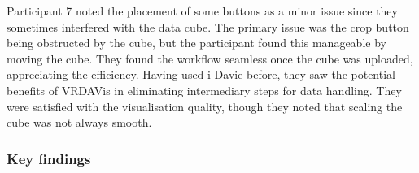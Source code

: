 



Participant 7 noted the placement of some buttons as a minor issue since they sometimes interfered with the data cube.
The primary issue was the crop button being obstructed by the cube, but the participant found this manageable by moving the cube. 
They found the workflow seamless once the cube was uploaded, appreciating the efficiency. 
Having used i-Davie before, they saw the potential benefits of VRDAVis in eliminating intermediary steps for data handling. 
They were satisfied with the visualisation quality, though they noted that scaling the cube was not always smooth. 


\subsubsection{Key findings}


